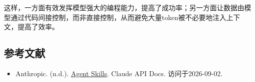 这样，一方面有效发挥模型强大的编程能力，提高了成功率；另一方面让数据由模型通过代码间接控制，而非直接控制，从而避免大量token被不必要地注入上下文，提高了效率。

\FloatBarrier
{}
\hypertarget{ux53c2ux8003ux6587ux732e-124}{%
\subsection{参考文献}\label{ux53c2ux8003ux6587ux732e-124}}

\vspace{0.25em}
\begin{itemize}
\tightlist
\item
  Anthropic. (n.d.). \href{https://platform.claude.com/docs/en/agents-and-tools/agent-skills/overview}{Agent Skills}. Claude API Docs. 访问于2026-09-02.
\end{itemize}

\clearpage
